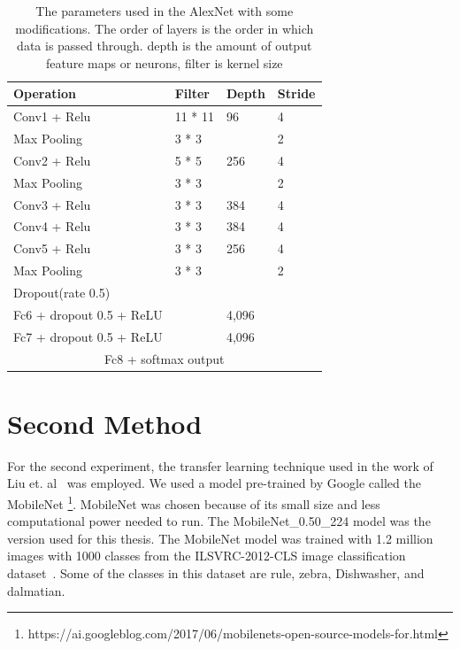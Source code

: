 \documentclass[12pt, a4paper,oneside]{report}
\begin{document}
\begin{table}[!htbp]
	\centering {} \small
	\begin{adjustbox}{max width=1.1\textwidth,center}
		
		\begin{tabular}{|p{3cm}|p{3cm}|p{3cm}|p{3cm}|}
			\hline	
			Operation & Filter & Depth & Stride \\ \hline
			
			Conv1 + Relu  &  11 * 11  & 96  & 4 \\  \hline	 
			
			Max Pooling & 3 * 3  &  & 2 \\ \hline	   
			
			Conv2 + Relu & 5 * 5 & 256  & 4 \\ \hline	
			
			Max Pooling & 3 * 3 & & 2 \\ \hline
			
			Conv3 + Relu & 3 * 3 & 384 & 4 \\ \hline	
			
			Conv4 + Relu & 3 * 3  & 384  & 4 \\ \hline	
			
			Conv5 + Relu & 3 * 3  & 256 & 4 \\ \hline	
			
			Max Pooling & 3 * 3 & & 2 \\ \hline
			
			Dropout(rate 0.5) &  & & \\ \hline
			
			Fc6 + dropout 0.5 + ReLU & & 4,096 & \\ \hline
			
			Fc7 + dropout 0.5 + ReLU & &  4,096 & \\ \hline
			
			\multicolumn{4}{|c|}{
				Fc8  + softmax output} \\
			\hline
		\end{tabular}	
	\end{adjustbox}
	\caption {The parameters used in the AlexNet with some modifications. The order of layers is the order in which
		data is passed through. depth is the amount of output feature maps or neurons, filter is kernel
		size}	
	\label{table:para}
\end{table}



\section{Second Method}
For the second experiment, the transfer learning technique used in the work of Liu et. al~\cite{liu2015chart} was employed. We used a model pre-trained by Google called the MobileNet \footnote{https://ai.googleblog.com/2017/06/mobilenets-open-source-models-for.html}. MobileNet was chosen because of its small size and less computational power needed to run. The MobileNet\_0.50\_224 model was the version used for this thesis. The MobileNet model was trained with 1.2 million images with 1000 classes from the ILSVRC-2012-CLS image classification dataset~\cite{ILSVRC15}. Some of the classes in this dataset are rule, zebra, Dishwasher, and dalmatian.
\end{document}
